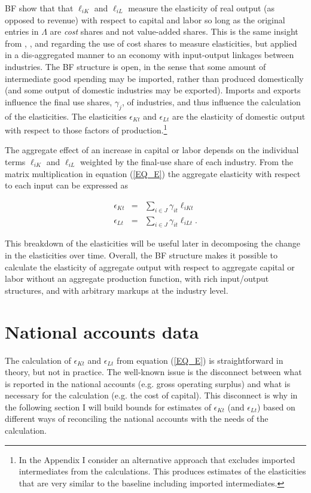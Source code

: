 \documentclass[11pt]{article}
\begin{document}
BF show that that $\ell_{iK}$ and $\ell_{iL}$ measure the elasticity of real output (as opposed to revenue) with respect to capital and labor so long as the original entries in $\Lambda$ are \textit{cost} shares and not value-added shares. This is the same insight from \cite{hall1988,hall1990}, \cite{basufernald}, and \cite{fernaldneiman2011} regarding the use of cost shares to measure elasticities, but applied in a dis-aggregated manner to an economy with input-output linkages between industries. The BF structure is open, in the sense that some amount of intermediate good spending may be imported, rather than produced domestically (and some output of domestic industries may be exported). Imports and exports influence the final use shares, $\gamma_j$, of industries, and thus influence the calculation of the elasticities. The elasticities $\epsilon_{Kt}$ and $\epsilon_{Lt}$ are the elasticity of domestic output with respect to those factors of production.\footnote{In the Appendix I consider an alternative approach that excludes imported intermediates from the calculations. This produces estimates of the elasticities that are very similar to the baseline including imported intermediates.}

The aggregate effect of an increase in capital or labor depends on the individual terms $\ell_{iK}$ and $\ell_{iL}$ weighted by the final-use share of each industry. From the matrix multiplication in equation (\ref{EQ_E}) the aggregate elasticity with respect to each input can be expressed as

\begin{eqnarray}
	\epsilon_{Kt} &=& \sum_{i \in J} \gamma_{it} \ell_{iKt} \\ \nonumber
	\epsilon_{Lt} &=& \sum_{i \in J} \gamma_{it} \ell_{iLt}. \label{EQ_epsilonK}
\end{eqnarray}

This breakdown of the elasticities will be useful later in decomposing the change in the elasticities over time. Overall, the BF structure makes it possible to calculate the elasticity of aggregate output with respect to aggregate capital or labor without an aggregate production function, with rich input/output structures, and with arbitrary markups at the industry level.

\section{National accounts data}\label{SEC_accounts}
The calculation of $\epsilon_{Kt}$ and $\epsilon_{Lt}$ from equation (\ref{EQ_E}) is straightforward in theory, but not in practice. The well-known issue is the disconnect between what is reported in the national accounts (e.g. gross operating surplus) and what is necessary for the calculation (e.g. the cost of capital). This disconnect is why in the following section I will build bounds for estimates of $\epsilon_{Kt}$ (and $\epsilon_{Lt}$) based on different ways of reconciling the national accounts with the needs of the calculation. 
\end{document}
